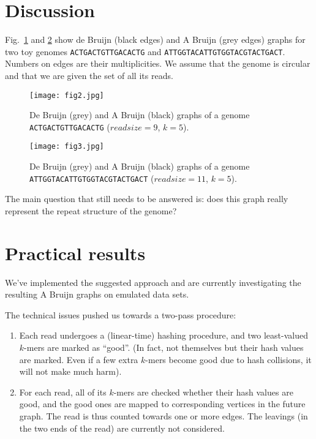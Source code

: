 \documentclass[12pt]{article}
\begin{document}
\section{Discussion}
Fig.~\ref{fig2} and \ref{fig3} show de Bruijn (black edges) and A Bruijn (grey edges) graphs for two toy genomes 
{\tt ACTGACTGTTGACACTG} and {\tt ATTGGTACATTGTGGTACGTACTGACT}. Numbers on edges are their multiplicities. 
We assume that the genome is circular and that we are given the set of all its reads.

\begin{figure}
\caption{De Bruijn (grey) and A Bruijn (black) graphs of a genome {\tt ACTGACTGTTGACACTG} ($readsize=9$, $k=5$).}\label{fig2}
\begin{center}\texttt{[image: fig2.jpg]}\end{center}
\end{figure}

\begin{figure}
\caption{De Bruijn (grey) and A Bruijn (black) graphs of a genome {\tt ATTGGTACATTGTGGTACGTACTGACT} ($readsize=11$, $k=5$).}\label{fig3}
\begin{center}\texttt{[image: fig3.jpg]}\end{center}
\end{figure}


The main question that still needs to be answered is:
does this graph really represent the repeat structure of the genome?

\section{Practical results}

We've implemented the suggested approach and are currently investigating the resulting A Bruijn graphs
on emulated data sets.

The technical issues pushed us towards a two-pass procedure:
\begin{enumerate}
  \item Each read undergoes a (linear-time) hashing procedure, and two least-valued $k$-mers are marked as
  ``good''. (In fact, not themselves but their hash values are marked. Even if a few extra $k$-mers become
  good due to hash collisions, it will not make much harm).
  \item For each read, all of its $k$-mers are checked whether their hash values are good, and the good ones
  are mapped to corresponding vertices in the future graph. The read is thus counted towards one or more edges.
  The leavings (in the two ends of the read) are currently not considered.
\end{enumerate}
\end{document}
